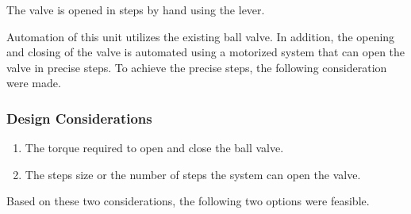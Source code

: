 \par
The valve is opened in steps by hand using the lever.
\par
Automation of this unit utilizes the existing ball valve. In addition, the opening and closing of the valve is automated using a motorized system that can open the valve in precise steps. To achieve the precise steps, the following consideration were made. 
\subsubsection{Design Considerations}
\begin{enumerate}
    \item The torque required to open and close the ball valve.
    \item The steps size or the number of steps the system can open the valve.
\end{enumerate}
\par
Based on these two considerations, the following two options were feasible.
